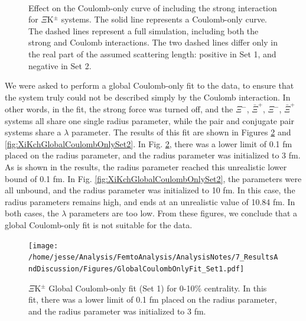 \documentclass[/home/jesse/Analysis/FemtoAnalysis/AnalysisNotes/AnalysisNoteJBuxton.tex]{subfiles}
\begin{document}
\begin{figure}[h]
  \centering
  \\
  \caption[Effect of strong force inclusion on Coulomb-only curve]{Effect on the Coulomb-only curve of including the strong interaction for $\Xi$K$^{\pm}$ systems.  The solid line represents a Coulomb-only curve.  The dashed lines represent a full simulation, including both the strong and Coulomb interactions.  The two dashed lines differ only in the real part of the assumed scattering length: positive in Set 1, and negative in Set 2.}
  \label{fig:XiKchStrongInfluence}
\end{figure}

We were asked to perform a global Coulomb-only fit to the data, to ensure that the system truly could not be described simply by the Coulomb interaction.  
In other words, in the fit, the strong force was turned off, and the $\Xi^{-}$\KchP, $\bar{\Xi}^{+}$\KchM, $\Xi^{-}$\KchM, $\bar{\Xi}^{+}$\KchP systems all share one single radius parameter, while the pair and conjugate pair systems share a $\lambda$ parameter.  
The results of this fit are shown in Figures \ref{fig:XiKchGlobalCoulombOnlySet1} and \ref{fig:XiKchGlobalCoulombOnlySet2}.  
In Fig. \ref{fig:XiKchGlobalCoulombOnlySet1}, there was a lower limit of 0.1 fm placed on the radius parameter, and the radius parameter was initialized to 3 fm.  
As is shown in the results, the radius parameter reached this unrealistic lower bound of 0.1 fm.  
In Fig. \ref{fig:XiKchGlobalCoulombOnlySet2}, the parameters were all unbound, and the radius parameter was initialized to 10 fm.  
In this case, the radius parameters remains high, and ends at an unrealistic value of 10.84 fm.  
In both cases, the $\lambda$ parameters are too low.  
From these figures, we conclude that a global Coulomb-only fit is not suitable for the data.

\begin{figure}[h]
  \centering
  \texttt{[image: /home/jesse/Analysis/FemtoAnalysis/AnalysisNotes/7\_ResultsAndDiscussion/Figures/GlobalCoulombOnlyFit\_Set1.pdf]}
  \caption[$\Xi$K$^{\pm}$ global Coulomb-only fit (Set 1)]{$\Xi$K$^{\pm}$ Global Coulomb-only fit (Set 1) for 0-10\% centrality.  In this fit, there was a lower limit of 0.1 fm placed on the radius parameter, and the radius parameter was initialized to 3 fm.}
  \label{fig:XiKchGlobalCoulombOnlySet1}
\end{figure}
\end{document}
